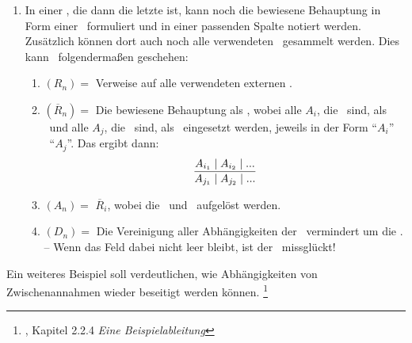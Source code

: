 {\begin{enumerate}
	Nun kann die Zeile beendet werden, oder es geht weiter mit:
	\begin{enumerate}
		\setcounter{enumii}{\value{Enumii}}%
		\item \label{item:Anwendung} $Z_n =$ Die Indizes aller $A_j$ (mit $j < i$), die eine \Voraussetzung\ der \Schlussregel\ $\overline{R}_i$ sind, möglichst in der verwendeten Reihenfolge.
		-- Für jedes angegebene $j$ werden noch die Abhängigkeiten $D_j$ den Abhängigkeiten $D_i$ hinzugefügt.
		\item $A_i =$ \Folgerung(en) der \Schlussregel\ $\overline{R}_i$.
		-- Wenn diese \Folgerungen\ schon als \Aussagen\ $A_j$ (mit $j < i$) vorhanden sind, können auch einfach deren Indizes eingetragen werden.
		Damit werden die Zusammenhänge und der Abschluss des \Beweises\ besser ersichtlich.
		\item $D_i =$ Die Verweise wurden schon in (\ref{item:Anwendung}) eingetragen.%
		\footnote{Wenn $D_n$ leer ist, dann ist $A_n$ allgemeingültig.}
	\end{enumerate}
	Der \Beweis\ muss so lange fortgeführt werden, bis alle \Folgerungen\ als \Aussagen\ in der Spalte $(A_n)$ erschienen und dort jeweils nur von den gegebenen \Voraussetzungen\ abhängig sind.
	\item \label{item:Ergebniszeile} In einer , die dann die letzte ist, kann noch die bewiesene Behauptung in Form einer \Schlussregel\ formuliert und in einer passenden Spalte notiert werden.
	Zusätzlich können dort auch noch alle verwendeten \Schlussregeln\ gesammelt werden.
	Dies kann \textzB\ folgendermaßen geschehen:
	\begin{enumerate}
		\item $(R_n) =$ Verweise auf alle verwendeten externen \Schlussregeln.
		\item $(\overline{R}_n) =$ Die bewiesene Behauptung als \Schlussregeln, wobei alle $A_i$, die \Voraussetzungen\ sind, als \Voraussetzung\ und alle $A_j$, die \Folgerungen\ sind, als \Folgerung\ eingesetzt werden, jeweils in der Form \enquote{$A_i$} \textbzgl\ \enquote{$A_j$}.
		Das ergibt dann:
		\[ \frac{A_{i_1} \mathrel{\mid} A_{i_2} \mathrel{\mid} ...}{A_{j_1} \mathrel{\mid} A_{j_2} \mathrel{\mid} ...} \]
		\item $(A_n) =$ $\overline{R}_i$, wobei die \Voraussetzungen\ und \Folgerungen\ aufgelöst werden.
		\item $(D_n) =$ Die Vereinigung aller Abhängigkeiten der \Folgerungen\, vermindert um die \Voraussetzungen.
		-- Wenn das Feld dabei nicht leer bleibt, ist der \Beweis\ missglückt!
	\end{enumerate}
\end{enumerate}
%
Ein weiteres Beispiel  soll verdeutlichen, wie Abhängigkeiten von Zwischenannahmen wieder beseitigt werden können.%
\footnote{, Kapitel 2.2.4 \emph{Eine Beispielableitung}}

}
